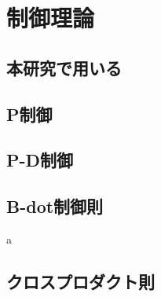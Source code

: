 \section{制御理論}

\subsection{本研究で用いる}
\subsection{P制御}

\subsection{P-D制御}
\newpage
\subsection{B-dot制御則}
\newpage
a
\newpage

\subsection{クロスプロダクト則}
\newpage
